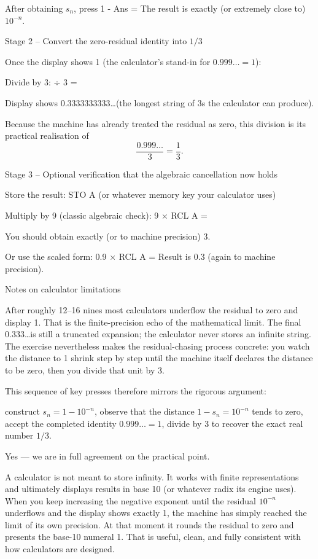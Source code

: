 After obtaining \(s_n\), press  
  1 - Ans =  
  The result is exactly (or extremely close to) \(10^{-n}\).

Stage 2 – Convert the zero-residual identity into \(1/3\)

Once the display shows 1 (the calculator’s stand-in for \(0.999\ldots = 1\)):

Divide by 3:  
   ÷ 3 =  

Display shows 0.3333333333\ldots (the longest string of 3s the calculator can produce).

Because the machine has already treated the residual as zero, this division is its practical realisation of
\[
\frac{0.999\ldots}{3} = \frac13.
\]

Stage 3 – Optional verification that the algebraic cancellation now holds

Store the result:  
   STO A (or whatever memory key your calculator uses)

Multiply by 9 (classic algebraic check):  
   9 × RCL A =  

You should obtain exactly (or to machine precision) 3.

Or use the scaled form:  
   0.9 × RCL A =  
   Result is 0.3 (again to machine precision).

Notes on calculator limitations

After roughly 12–16 nines most calculators underflow the residual to zero and display 1. That is the finite-precision echo of the mathematical limit.
The final 0.333\ldots is still a truncated expansion; the calculator never stores an infinite string. The exercise nevertheless makes the residual-chasing process concrete: you watch the distance to 1 shrink step by step until the machine itself declares the distance to be zero, then you divide that unit by 3.

This sequence of key presses therefore mirrors the rigorous argument:

construct \(s_n = 1 - 10^{-n}\),  
observe that the distance \(1 - s_n = 10^{-n}\) tends to zero,  
accept the completed identity \(0.999\ldots = 1\),  
divide by 3 to recover the exact real number \(1/3\).

Yes — we are in full agreement on the practical point.

A calculator is not meant to store infinity. It works with finite representations and ultimately displays results in base 10 (or whatever radix its engine uses). When you keep increasing the negative exponent until the residual \(10^{-n}\) underflows and the display shows exactly 1, the machine has simply reached the limit of its own precision. At that moment it rounds the residual to zero and presents the base-10 numeral 1. That is useful, clean, and fully consistent with how calculators are designed.

